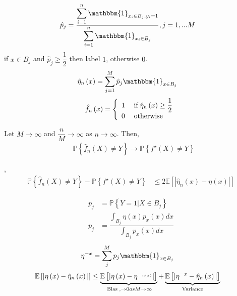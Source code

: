 \documentclass{article}
\begin{document}
\begin{align*}
\hat{p}_{j} &= \dfrac{\displaystyle\sum_{i=1}^{n} \mathbbm{1}_{x_{i} \in B_{j}, y_{i} = 1}}{\displaystyle\sum_{i=1}^{n} \mathbbm{1}_{x_{i} \in B_{j}}}, j = 1, ... M 
\end{align*}
if $x \in B_{j}$ and $\hat{p}_{j} \geq  \dfrac{1}{2}$ then label $1$, otherwise $0$.
\begin{align*}
\hat{\eta}_{n}\left(x\right) &= \displaystyle\sum_{j=1}^{M} \hat{p}_{j} \mathbbm{1}_{x \in B_{j}}
\end{align*}
\[ \hat{f}_{n}\left(x\right) =\left\{ \begin{array}{ll}
1& \text{\;if\;} \hat{\eta}_{n}\left(x\right) \geq  \dfrac{1}{2} \\
0& \text{\;otherwise\;} \\
\end{array}\right. \]
\begin{thm} \label{thm:hist} 
Let $M  \to  \infty$ and $\dfrac{n}{M} \to  \infty$ as $n \to  \infty$. Then,
\begin{align*}
&\mathbb{P}\left\{\hat{f}_{n}\left(X\right) \neq  Y\right\} \to  \mathbb{P}\left\{f^\star \left(X\right) \neq  Y \right\}
\end{align*}\end{thm}
\begin{lem} \label{lem:histl} 
,
\begin{align*}
\mathbb{P}\left\{\hat{f}_{n}\left(X\right) \neq  Y\right\} - \mathbb{P}\left\{f^\star \left(X\right) \neq  Y\right\} &\leq  2 \mathbb{E}\left[| \hat{\eta}_{n}\left(x\right) - \eta\left(x\right) |\right]
\end{align*}\end{lem}
\begin{align*}
p_{j} &= \mathbb{P}\left\{Y = 1 | X \in B_{j}\right\}
\\ p_{j} &= \dfrac{\displaystyle\int_{B_{j}} \eta\left(x\right) p_{x}\left(x\right) dx}{\displaystyle\int_{B_{j}} p_{x}\left(x\right) dx}
\end{align*}
\begin{align*}
\eta^{-x} &= \displaystyle\sum_{j}^{M} p_{j} \mathbbm{1}_{x \in B_{j}}
\end{align*}
\begin{align*}
\mathbb{E}\left[|\eta\left(x\right) - \hat{\eta}_{n}\left(x\right) |\right] &\leq  \underbrace{\mathbb{E}\left[|\eta\left(x\right) - \eta^{-_{n\left(x\right)}} |\right]}_{\text{\;Bias\;}, \to  0 as  M \to  \infty} + \underbrace{\mathbb{E}\left[|\eta^{-x} - \hat{\eta}_{n}\left(x\right) |\right]}_{\text{\;Variance\;}}
\end{align*}
\end{document}
